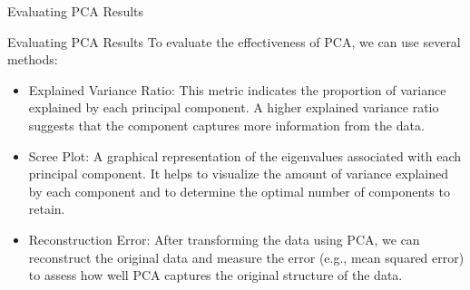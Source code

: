 \documentclass[hyperref={pdfpagelabels=false},aspectratio=169]{beamer}
\begin{document}
\begin{frame}[label={sec:org57b4efa}]{Evaluating PCA Results}
\begin{block}{Evaluating PCA Results}
\pause
To evaluate the effectiveness of PCA, we can use several methods:
\begin{itemize}[<+->]
\item \alert{\alert{Explained Variance Ratio}}: This metric indicates the proportion of variance explained by each principal component. A higher explained variance ratio suggests that the component captures more information from the data.
\item \alert{\alert{Scree Plot}}: A graphical representation of the eigenvalues associated with each principal component. It helps to visualize the amount of variance explained by each component and to determine the optimal number of components to retain.
\item \alert{\alert{Reconstruction Error}}: After transforming the data using PCA, we can reconstruct the original data and measure the error (e.g., mean squared error) to assess how well PCA captures the original structure of the data.
\end{itemize}
\end{block}
\end{frame}
\end{document}
